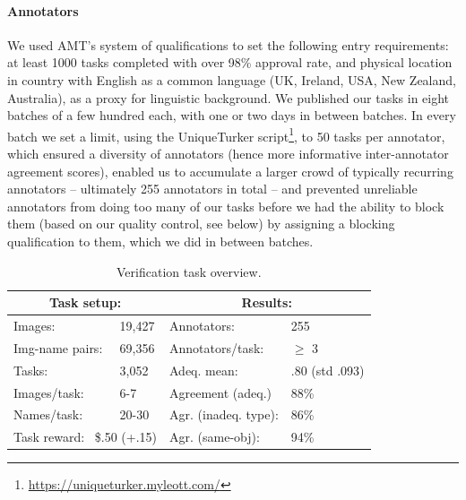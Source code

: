 \documentclass[11pt,a4paper]{article}
\begin{document}
\paragraph{Annotators}
We used AMT's system of qualifications to set the following entry requirements: at least 1000 tasks completed with over 98\% approval rate, and physical location in country with English as a common language (UK, Ireland, USA, New Zealand, Australia), as a proxy for linguistic background.
We published our tasks in eight batches of a few hundred each, with one or two days in between batches.
In every batch we set a limit, using the UniqueTurker script\footnote{\url{https://uniqueturker.myleott.com/}}, to 50 tasks per annotator, which ensured a diversity of annotators (hence more informative inter-annotator agreement scores), enabled us to accumulate a larger crowd of typically recurring annotators -- ultimately 255 annotators in total -- and prevented unreliable annotators from doing too many of our tasks before we had the ability to block them (based on our quality control, see below) by assigning a blocking qualification to them, which we did in between batches.
\begin{table}[t]
	\centering
	\small
	\begin{tabular}{|ll|ll|}
		\hline
		\multicolumn{2}{|c|}{\textbf{Task setup:}} & \multicolumn{2}{c|}{\textbf{Results:}} \\ \hline
		Images: & 19,427 &
		Annotators: & 255 \\
		Img-name pairs: & 69,356 &
		Annotators/task: & $\geq$ 3 \\
		Tasks: & 3,052 &
		Adeq. mean: & \hspace{-3em}.80 (std .093)\\
		Images/task: & 6-7 &			
		Agreement (adeq.) & 88\% \\ 
		Names/task: & 20-30 &
		Agr. (inadeq. type): & 86\% \\
		\multicolumn{2}{|l|}{Task reward: \ \$.50 (+.15)} & 
		Agr. (same-obj): & 94\% \\
		\hline
	\end{tabular}
	\caption{Verification task overview. 
		\label{tab:verification-numbers}}
\end{table}
\end{document}
